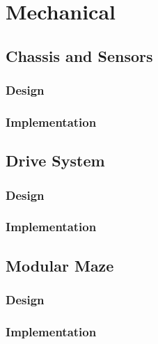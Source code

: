
\chapter{Mechanical}\label{mechanical}

\section{Chassis and Sensors}\label{mech/chassis}

\subsection{Design}\label{mech/chassis/design}

\subsection{Implementation}\label{mech/chassis/impl}



\section{Drive System}\label{mech/drive}

\subsection{Design}\label{mech/drive/design}

\subsection{Implementation}\label{mech/drive/impl}



\section{Modular Maze}\label{mech/maze}

\subsection{Design}\label{mech/maze/design}

\subsection{Implementation}\label{mech/maze/impl}